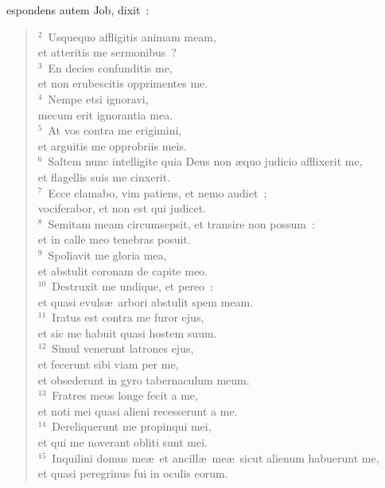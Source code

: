 \bchapter
{}espondens autem Job, dixit~:
\begin{flushleft}\begin{verse}\vspace{6pt}${}^{2}$~Usquequo affligitis animam meam,\\ et atteritis me sermonibus~?\\
${}^{3}$~En decies confunditis me,\\ et non erubescitis opprimentes me.\\
${}^{4}$~Nempe etsi ignoravi,\\ mecum erit ignorantia mea.\\
${}^{5}$~At vos contra me erigimini,\\ et arguitis me opprobriis meis.\\
${}^{6}$~Saltem nunc intelligite quia Deus non \ae quo judicio afflixerit me,\\ et flagellis suis me cinxerit.\\
${}^{7}$~Ecce clamabo, vim patiens, et nemo audiet~;\\ vociferabor, et non est qui judicet.\\
${}^{8}$~Semitam meam circumsepsit, et transire non possum~:\\ et in calle meo tenebras posuit.\\
${}^{9}$~Spoliavit me gloria mea,\\ et abstulit coronam de capite meo.\\
${}^{10}$~Destruxit me undique, et pereo~:\\ et quasi evuls\ae\ arbori abstulit spem meam.\\
${}^{11}$~Iratus est contra me furor ejus,\\ et sic me habuit quasi hostem suum.\\
${}^{12}$~Simul venerunt latrones ejus,\\ et fecerunt sibi viam per me,\\ et obsederunt in gyro tabernaculum meum.\\
${}^{13}$~Fratres meos longe fecit a me,\\ et noti mei quasi alieni recesserunt a me.\\
${}^{14}$~Dereliquerunt me propinqui mei,\\ et qui me noverant obliti sunt mei.\\
${}^{15}$~Inquilini domus me\ae\ et ancill\ae\ me\ae\ sicut alienum habuerunt me,\\ et quasi peregrinus fui in oculis eorum.\\

\end{verse}
\end{flushleft}
